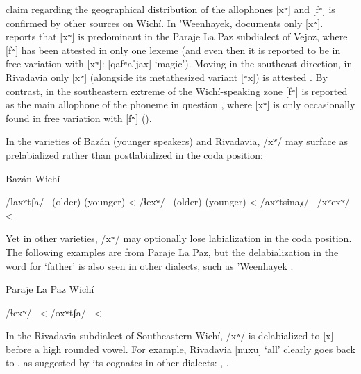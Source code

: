  claim regarding the geographical distribution of the allophones [xʷ] and [fʷ] is confirmed by other sources on Wichí. In 'Weenhayek, \citet{KC94} documents only [xʷ]. \citet{AFG067} reports that [xʷ] is predominant in the Paraje La Paz subdialect of Vejoz, where [fʷ] has been attested in only one lexeme (and even then it is reported to be in free variation with [xʷ]: [qafʷaˈjax] \recind [qaxʷaˈjax] ‘magic’). Moving in the southeast direction, in Rivadavia only [xʷ] (alongside its metathesized variant [ʷx]) is attested \citep[45--46]{JT09-th}. By contrast, in the southeastern extreme of the Wichí-speaking zone [fʷ] is reported as the main allophone of the phoneme in question \citep[51]{VN14}, where [xʷ] is only occasionally found in free variation with [fʷ] ().

In the varieties of Bazán (younger speakers) and Rivadavia, /xʷ/ may surface as prelabialized rather than postlabialized in the coda position:

\ea
Bazán Wichí\\
    \begin{xlist}
        \ex /laxʷtʃa/~ (older) \recind {} (younger) \citep[140]{MC09} < 
        \ex /ɬexʷ/~ (older) \recind {} (younger) \citep[140]{MC09} < 
        \ex /axʷtsinaχ/~ \citep[6]{JB09}
        \ex /xʷexʷ/~ \citep[6]{JB09} < 
    \end{xlist}
\z

Yet in other varieties, /xʷ/ may optionally lose labialization in the coda position. The following examples are from Paraje La Paz, but the delabialization in the word for `father'  is also seen in other dialects, such as ’Weenhayek \citep[60]{KC16}.

\ea
Paraje La Paz Wichí \citep{AFG067}\\
    \begin{xlist}
        \ex /ɬexʷ/~ \recind {} < 
        \ex /oxʷtʃa/~ \recind {} < \label{plp-ojcha}
    \end{xlist}
\z
{}

In the Rivadavia subdialect of Southeastern Wichí, /xʷ/ is delabialized to [x] before a high rounded vowel. For example, Rivadavia [nuxu] ‘all’ \citep[63]{JT09-cap} clearly goes back to , as suggested by its cognates in other dialects: ,  \citep{MC09,VN14,KC16}.

